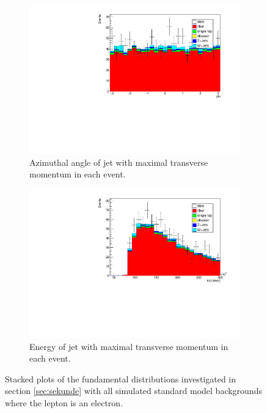\begin{figure}[H]
  \begin{subfigure}{0.45\textwidth}%
    \centering%
    \includegraphics[width=\textwidth]{plots/comparism/jet_phi_max.pdf}%
    \caption{Azimuthal angle of jet with maximal transverse momentum in each event.}%
    \label{fig:6g}%
  \end{subfigure}%
  \hfill
  \begin{subfigure}{0.45\textwidth}%
    \centering%
    \includegraphics[width=\textwidth]{plots/comparism/jet_E_max.pdf}%
    \caption{Energy of jet with maximal transverse momentum in each event.}%
    \label{fig:6h}%
  \end{subfigure}%
  \caption{Stacked plots of the fundamental distributions investigated in section \ref{sec:sekunde} with all simulated standard model backgrounds where the lepton 
  is an electron.}%
  \label{fig:6}%
\end{figure}

